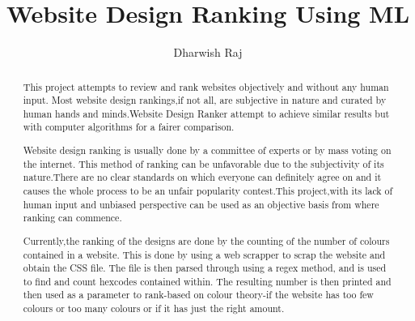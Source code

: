 \documentclass{fisatproject}
\title{Website Design Ranking Using ML}
\author{Dharwish Raj}
\begin{document}
\maketitle

\makecert

\newpage
\setcounter{page}{1}
\renewcommand\abstractname{ABSTRACT}
\begin{abstract}
\vspace{5cm}
This project attempts to review and rank websites objectively and without any human input. Most website design rankings,if not all, are subjective in nature and curated by human hands and minds.Website Design Ranker attempt to achieve similar results but with computer algorithms for a fairer comparison.

Website design ranking is usually done by a committee of experts or by mass voting on the internet. This method of ranking can be unfavorable due to the subjectivity of its nature.There are no clear standards on which everyone can definitely agree on and it causes the whole process to be an unfair popularity contest.This project,with its lack of human input and unbiased perspective can be used as an objective basis from where ranking can commence.

Currently,the ranking of the designs are done by the counting of the number of colours contained in a website. This is done by using a web scrapper to scrap the website and obtain the CSS file. The file is then parsed through using a regex method, and is used to find and count hexcodes contained within. The resulting number is then printed and then used as a parameter to rank-based on colour theory-if the website has too few colours or too many colours or if it has just the right amount.
\end{abstract}
\end{document}
